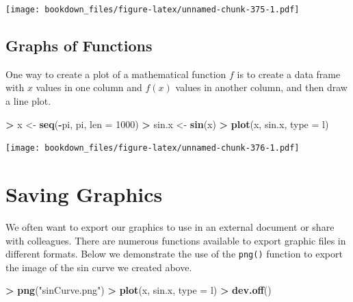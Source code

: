 \documentclass[
]{krantz}
\makeatletter
\newenvironment{Shaded}{\begin{snugshade}}{\end{snugshade}}
\newcommand{\DataTypeTok}[1]{\textcolor[rgb]{0.27,0.27,0.27}{#1}}
\newcommand{\DecValTok}[1]{\textcolor[rgb]{0.06,0.06,0.06}{#1}}
\newcommand{\KeywordTok}[1]{\textcolor[rgb]{0.27,0.27,0.27}{\textbf{#1}}}
\newcommand{\NormalTok}[1]{#1}
\newcommand{\OperatorTok}[1]{\textcolor[rgb]{0.43,0.43,0.43}{\textbf{#1}}}
\newcommand{\StringTok}[1]{\textcolor[rgb]{0.5,0.5,0.5}{#1}}
\newenvironment{kframe}{%
\medskip{}
\setlength{\fboxsep}{.8em}
 \def\at@end@of@kframe{}%
 \ifinner\ifhmode%
  \def\at@end@of@kframe{\end{minipage}}%
  \begin{minipage}{\columnwidth}%
 \fi\fi%
 \def\FrameCommand##1{\hskip\@totalleftmargin \hskip-\fboxsep
 \colorbox{shadecolor}{##1}\hskip-\fboxsep
     \hskip-\linewidth \hskip-\@totalleftmargin \hskip\columnwidth}%
 \MakeFramed {\advance\hsize-\width
   \@totalleftmargin\z@ \linewidth\hsize
   \@setminipage}}%
 {\par\unskip\endMakeFramed%
 \at@end@of@kframe}
\renewenvironment{Shaded}{\begin{kframe}}{\end{kframe}}
\makeatother
\begin{document}
\texttt{[image: bookdown\_files/figure-latex/unnamed-chunk-375-1.pdf]}

\hypertarget{graphs-of-functions-1}{%
\subsection{Graphs of Functions}\label{graphs-of-functions-1}}

One way to create a plot of a mathematical function \(f\) is to create a data frame with \(x\) values in one column and \(f(x)\) values in another column, and then draw a line plot.

\begin{Shaded}
\begin{Highlighting}[]
\OperatorTok{\textgreater{}}\StringTok{ }\NormalTok{x \textless{}{-}}\StringTok{ }\KeywordTok{seq}\NormalTok{(}\OperatorTok{{-}}\NormalTok{pi, pi, }\DataTypeTok{len =} \DecValTok{1000}\NormalTok{)}
\OperatorTok{\textgreater{}}\StringTok{ }\NormalTok{sin.x \textless{}{-}}\StringTok{ }\KeywordTok{sin}\NormalTok{(x)}
\OperatorTok{\textgreater{}}\StringTok{ }\KeywordTok{plot}\NormalTok{(x, sin.x, }\DataTypeTok{type =} \StringTok{\textquotesingle{}l\textquotesingle{}}\NormalTok{)}
\end{Highlighting}
\end{Shaded}

\texttt{[image: bookdown\_files/figure-latex/unnamed-chunk-376-1.pdf]}

\hypertarget{saving-graphics-1}{%
\section{Saving Graphics}\label{saving-graphics-1}}

We often want to export our graphics to use in an external document or share with colleagues. There are numerous functions available to export graphic files in different formats. Below we demonstrate the use of the \texttt{png()} function to export the image of the sin curve we created above.

\begin{Shaded}
\begin{Highlighting}[]
\OperatorTok{\textgreater{}}\StringTok{ }\KeywordTok{png}\NormalTok{(}\StringTok{"sinCurve.png"}\NormalTok{)}
\OperatorTok{\textgreater{}}\StringTok{ }\KeywordTok{plot}\NormalTok{(x, sin.x, }\DataTypeTok{type =} \StringTok{\textquotesingle{}l\textquotesingle{}}\NormalTok{)}
\OperatorTok{\textgreater{}}\StringTok{ }\KeywordTok{dev.off}\NormalTok{()}
\end{Highlighting}
\end{Shaded}
\end{document}
